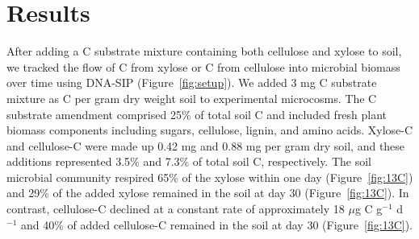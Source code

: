 \section{Results}
After adding a C substrate mixture containing both cellulose and xylose to
soil, we tracked the flow of C from xylose or C from cellulose into microbial
biomass over time using DNA-SIP (Figure~\ref{fig:setup}). We added 3 mg
C substrate mixture as C per gram dry weight soil to experimental microcosms.
The C substrate amendment comprised 25\% of total soil C and included fresh
plant biomass components including sugars, cellulose, lignin, and amino acids.
Xylose-C and cellulose-C were made up 0.42 mg and 0.88 mg per gram dry soil,
and these additions represented 3.5\% and 7.3\% of total soil C, respectively.
The soil microbial community respired 65\% of the xylose within one day
(Figure~\ref{fig:13C}) and 29\% of the added xylose remained in the soil at day
30 (Figure~\ref{fig:13C}). In contrast, cellulose-C declined at a constant rate
of approximately 18 $\mu$g C g$^{-1}$ d$^{-1}$ and 40\% of added cellulose-C
remained in the soil at day 30 (Figure~\ref{fig:13C}). 

